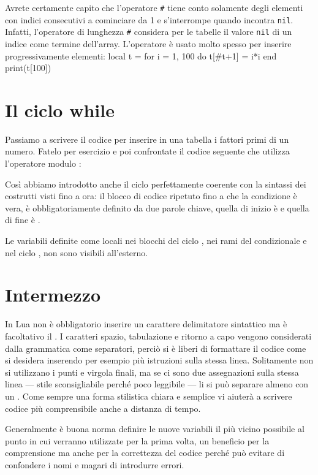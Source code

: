 Avrete certamente capito che l'operatore \texttt{\#} tiene conto solamente
degli elementi con indici consecutivi a cominciare da 1 e s'interrompe quando
incontra \texttt{nil}. Infatti, l'operatore di lunghezza \texttt{\#} considera
per le tabelle il valore \texttt{nil} di un indice come termine dell'array.
L'operatore è usato molto spesso per inserire progressivamente elementi:
\lines
local t = {}
for i = 1, 100 do
    t[#t+1] = i*i
end
print(t[100])
\endlines
{}


\section{Il ciclo while}
\label{secCicloWhile}

Passiamo a scrivere il codice per inserire in una tabella i fattori primi di un
numero. Fatelo per esercizio e poi confrontate il codice seguente che utilizza
l'operatore modulo \key{\%}:

Così abbiamo introdotto anche il ciclo  perfettamente coerente con
la sintassi dei costrutti visti fino a ora: il blocco di codice ripetuto fino a
che la condizione è vera, è obbligatoriamente definito da due parole chiave,
quella di inizio è  e quella di fine è .

Le variabili definite come locali nei blocchi del ciclo , nei rami del
condizionale  e nel ciclo , non sono visibili all'esterno.


\section{Intermezzo}

In Lua non è obbligatorio inserire un carattere delimitatore sintattico ma è
facoltativo il \key{;}. I caratteri spazio, tabulazione e ritorno a capo vengono
considerati dalla grammatica come separatori, perciò si è liberi di formattare
il codice come si desidera inserendo per esempio più istruzioni sulla stessa
linea. Solitamente non si utilizzano i punti e virgola finali, ma se ci sono due
assegnazioni sulla stessa linea --- stile sconsigliabile perché poco leggibile
--- li si può separare almeno con un \key{;}. Come sempre una forma stilistica
chiara e semplice vi aiuterà a scrivere codice più comprensibile anche a
distanza di tempo.

Generalmente è buona norma definire le nuove variabili il più vicino possibile
al punto in cui verranno utilizzate per la prima volta, un beneficio per la
comprensione ma anche per la correttezza del codice perché può evitare di
confondere i nomi e magari di introdurre errori.


